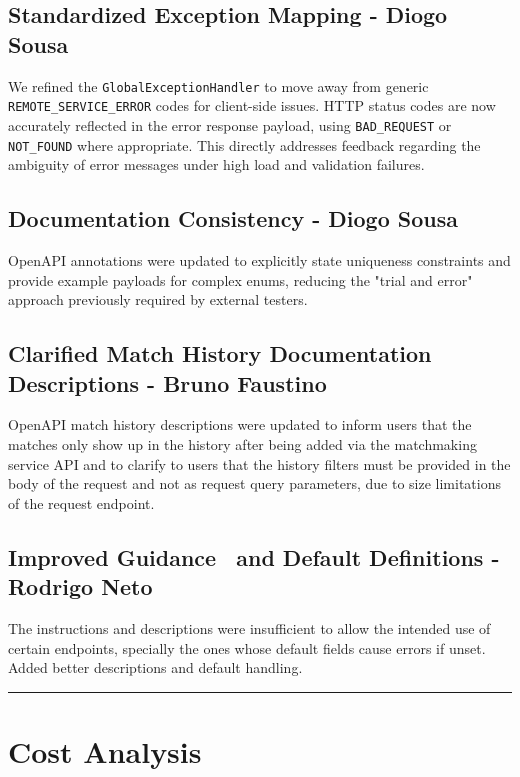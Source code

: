 \documentclass[11pt,a4paper]{article}
\begin{document}
 \subsection{Standardized Exception Mapping - Diogo Sousa}
 We refined the \texttt{GlobalExceptionHandler} to move away from generic \texttt{REMOTE\_SERVICE\_ERROR} codes for client-side issues. HTTP status codes are now accurately reflected in the error response payload, using \texttt{BAD\_REQUEST} or \texttt{NOT\_FOUND} where appropriate. This directly addresses feedback regarding the ambiguity of error messages under high load and validation failures.

 \subsection{Documentation Consistency - Diogo Sousa}
 OpenAPI annotations were updated to explicitly state uniqueness constraints and provide example payloads for complex enums, reducing the "trial and error" approach previously required by external testers.

 \subsection{Clarified Match History Documentation Descriptions - Bruno Faustino}
 OpenAPI match history descriptions were updated to inform users that the matches only show up in the history after being added via the matchmaking service API and to clarify to users that the history filters must be provided in the body of the request and not as request query parameters, due to size limitations of the request endpoint.

 \subsection{Improved Guidance  and Default Definitions - Rodrigo Neto}
 The instructions and descriptions were insufficient to allow the intended use of certain endpoints, specially the ones whose default fields cause errors if unset. Added better descriptions and default handling.

 \vspace{1cm}
 \hrule
 \vspace{1cm}

 \section{Cost Analysis}
\end{document}
